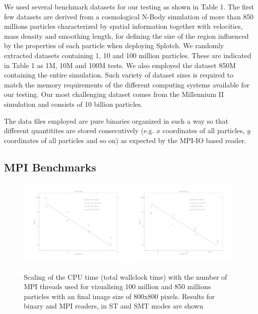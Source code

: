 We used several benchmark datasets for our testing as shown in Table 1. The first 
few datasets are derived from a cosmological N-Body simulation of more than 850 millions 
particles characterized by spatial information together with velocities, mass density 
and smoothing length, for defining the size of the region influenced by the properties 
of each particle when deploying Splotch. We randomly extracted datasets containing 
1, 10 and 100 million particles. These are indicated in Table 1 as 1M, 
10M and 100M tests. We also employed the dataset 850M containing the entire simulation. 
Such variety of dataset sizes is required to match the memory requirements of 
the different computing systems available for our testing.  
Our most challenging dataset comes from the Millennium II simulation \cite{2009MNRAS.398.1150B} 
and consists of 10 billion particles.

The data files employed are pure binaries organized in such a way so that different 
quantitites are stored consecutively (e.g. $x$ coordinates of all particles, $y$ coordinates 
of all particles and so on) as expected by the MPI-IO based reader. 

\subsection{MPI Benchmarks}

\begin{figure}
\begin{center}
\includegraphics[width=0.49\textwidth]{bench100M_r.pdf}
\includegraphics[width=0.49\textwidth]{bench870M_r.pdf}
\end{center}
\caption{Scaling of the CPU time (total wallclock time) with the number of MPI threads 
used for vizualising 100 million
and 850 millions particles with an final image size of 800x800 pixels.
Results for binary and MPI readers, in ST and SMT modes are shown}\label{mpi100M}
\end{figure}

